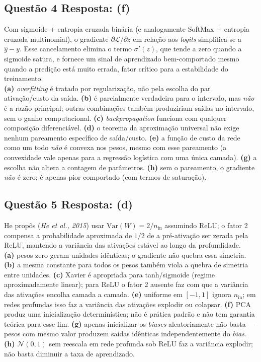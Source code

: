 \documentclass[11pt,a4paper]{article}
\begin{document}
\subsection*{Questão 4 \textemdash{} Resposta: (f)}
Com sigmoide + entropia cruzada binária (e analogamente SoftMax + entropia cruzada multinomial), o gradiente $\partial \mathcal{L}/\partial z$ em relação aos \textit{logits} simplifica-se a $\hat{y} - y$. Esse cancelamento elimina o termo $\sigma'(z)$, que tende a zero quando a sigmoide satura, e fornece um sinal de aprendizado bem-comportado mesmo quando a predição está muito errada, fator crítico para a estabilidade do treinamento.\\
\textbf{(a)} \textit{overfitting} é tratado por regularização, não pela escolha do par ativação/custo da saída.
\textbf{(b)} é parcialmente verdadeira para o intervalo, mas \emph{não} é a razão principal; outras combinações também produziriam saídas no intervalo, sem o ganho computacional.
\textbf{(c)} \textit{backpropagation} funciona com qualquer composição diferenciável.
\textbf{(d)} o teorema da aproximação universal não exige nenhum pareamento específico de saída/custo.
\textbf{(e)} a função de custo da rede como um todo \emph{não} é convexa nos pesos, mesmo com esse pareamento (a convexidade vale apenas para a regressão logística com uma única camada).
\textbf{(g)} a escolha não altera a contagem de parâmetros.
\textbf{(h)} sem o pareamento, o gradiente \emph{não} é zero; é apenas pior comportado (com termos de saturação).

\subsection*{Questão 5 \textemdash{} Resposta: (d)}
He propôs (\textit{He et al., 2015}) usar $\mathrm{Var}(W) = 2/n_{\text{in}}$ assumindo ReLU; o fator 2 compensa a probabilidade aproximada de $1/2$ de a pré-ativação ser zerada pela ReLU, mantendo a variância das ativações estável ao longo da profundidade.\\
\textbf{(a)} pesos zero geram unidades idênticas; o gradiente não quebra essa simetria.
\textbf{(b)} a mesma constante para todos os pesos também viola a quebra de simetria entre unidades.
\textbf{(c)} Xavier é apropriada para tanh/sigmoide (regime aproximadamente linear); para ReLU o fator 2 ausente faz com que a variância das ativações encolha camada a camada.
\textbf{(e)} uniforme em $[-1, 1]$ ignora $n_{\text{in}}$; em redes profundas isso faz a variância das ativações explodir ou colapsar.
\textbf{(f)} PCA produz uma inicialização determinística; não é prática padrão e não tem garantia teórica para esse fim.
\textbf{(g)} apenas inicializar os \textit{biases} aleatoriamente não basta — pesos com mesmo valor produzem saídas idênticas independentemente do \textit{bias}.
\textbf{(h)} $\mathcal{N}(0, 1)$ sem reescala em rede profunda sob ReLU faz a variância explodir; não basta diminuir a taxa de aprendizado.
\end{document}
